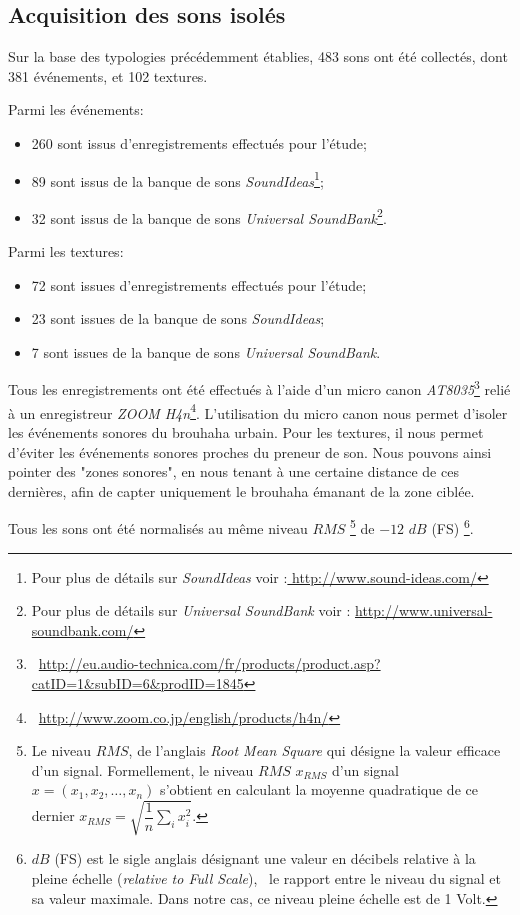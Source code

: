 \subsection{Acquisition des sons isolés}
\label{sec:ch5_recordDataSet}

Sur la base des typologies précédemment établies, 483 sons ont été collectés, dont 381 événements, et 102 textures.

Parmi les événements:

\begin{itemize}
\item 260 sont issus d’enregistrements effectués pour l'étude;
\item 89 sont issus de la banque de sons \emph{SoundIdeas}\footnote{Pour plus de détails sur \emph{SoundIdeas} voir :\url{ http://www.sound-ideas.com/}};
\item 32 sont issus de la banque de sons \emph{Universal SoundBank}\footnote{Pour plus de détails sur \emph{Universal SoundBank} voir : \url{http://www.universal-soundbank.com/}}.
\end{itemize}

Parmi les textures:

\begin{itemize}
\item 72 sont issues d’enregistrements effectués pour l'étude;
\item 23 sont issues de la banque de sons \emph{SoundIdeas};
\item 7 sont issues de la banque de sons \emph{Universal SoundBank}.
\end{itemize}

Tous les enregistrements ont été effectués à l’aide d'un micro canon \emph{AT8035}\footnote{\cf~\url{http://eu.audio-technica.com/fr/products/product.asp?catID=1&subID=6&prodID=1845}} relié à un enregistreur \emph{ZOOM H4n}\footnote{\cf~\url{http://www.zoom.co.jp/english/products/h4n/}}. L’utilisation du micro canon nous permet d’isoler les événements sonores du brouhaha urbain. Pour les textures, il nous permet d’éviter les événements sonores proches du preneur de son. Nous pouvons ainsi pointer des "zones sonores", en nous tenant à une certaine distance de ces dernières, afin de capter uniquement le brouhaha émanant de la zone ciblée.

Tous les sons ont été normalisés au même niveau $RMS$ \footnote{Le niveau $RMS$, de l'anglais \emph{Root Mean Square} qui désigne la valeur efficace d'un signal. Formellement, le niveau $RMS$ $x_{RMS}$ d'un signal $x=(x_1,x_2,\ldots,x_n)$ s'obtient en calculant la moyenne quadratique de ce dernier $x_{RMS}=\sqrt{\dfrac{1}{n}\sum\limits_{i} x_i^2}$.} de $-12$ $dB$ (FS) \footnote{$dB$ (FS) est le sigle anglais désignant une valeur en décibels relative à la pleine échelle (\emph{relative to Full Scale}), \ie~le rapport entre le niveau du signal et sa valeur maximale. Dans notre cas, ce niveau pleine échelle est de 1 Volt.}.

